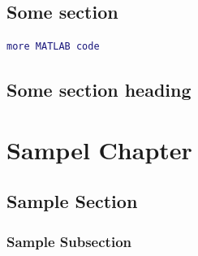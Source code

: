 \documentclass[a4paper,12pt,oneside,final]{report}
\newenvironment{changemargin}[2]{\begin{list}{}{%
\setlength{\topsep}{0pt}%
\setlength{\leftmargin}{0pt}%
\setlength{\rightmargin}{0pt}%
\setlength{\listparindent}{\parindent}%
\setlength{\itemindent}{\parindent}%
\setlength{\parsep}{0pt plus 1pt}%
\addtolength{\leftmargin}{#1}%
\addtolength{\rightmargin}{#2}%
}\item }{\end{list}}
\begin{document}
\paragraph{}
\paragraph{}
\section{Some section}
\begin{changemargin}{-5mm}{-5mm}
\begin{lstlisting}[language=Matlab, frame=single]
more MATLAB code
\end{lstlisting}
\end{changemargin}

\section{Some section heading}
\paragraph{}
\chapter{Sampel Chapter}
\paragraph{}
\section{Sample Section}
\subsection{Sample Subsection}
\paragraph{}
\paragraph{}
\paragraph{}
\paragraph{}
\end{document}
